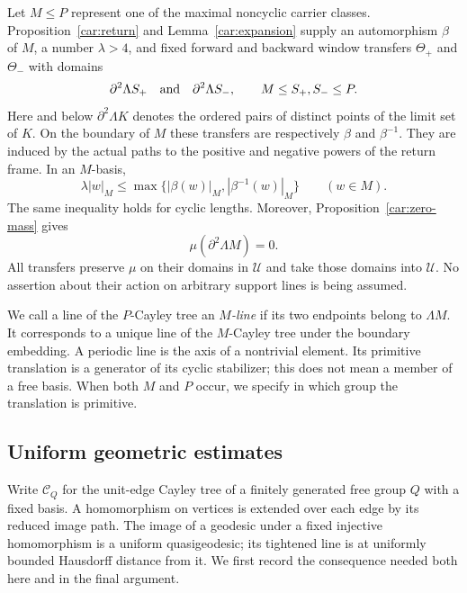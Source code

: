 Let $M\le P$ represent one of the maximal noncyclic carrier classes.
Proposition~\ref{car:return} and Lemma~\ref{car:expansion} supply
an automorphism $\beta$ of $M$, a number $\lambda>4$, and fixed forward
and backward window transfers $\Theta_+$ and $\Theta_-$ with domains
\[
 \partial^2\Lambda S_+\quad\hbox{and}\quad
 \partial^2\Lambda S_-,\qquad M\le S_+,S_-\le P.
\]
Here and below $\partial^2\Lambda K$ denotes the ordered pairs of
distinct points of the limit set of $K$. On the boundary of $M$ these
transfers are respectively $\beta$ and $\beta^{-1}$. They are induced
by the actual paths to the positive and negative powers of the return
frame. In an $M$-basis,
\begin{equation}
 \lambda |w|_M\le
 \max\{|\beta(w)|_M,|\beta^{-1}(w)|_M\}
 \qquad(w\in M).
 \label{exp:based-inequality}
\end{equation}
The same inequality holds for cyclic lengths. Moreover,
Proposition~\ref{car:zero-mass} gives
\begin{equation}
 \mu(\partial^2\Lambda M)=0.
 \label{exp:zero-carrier-mass}
\end{equation}
All transfers preserve $\mu$ on their domains in $\mathcal U$ and
take those domains into $\mathcal U$. No assertion about their action
on arbitrary support lines is being assumed.

We call a line of the $P$-Cayley tree an \emph{$M$-line} if its two
endpoints belong to $\Lambda M$. It corresponds to a unique line of
the $M$-Cayley tree under the boundary embedding. A periodic line is
the axis of a nontrivial element. Its primitive translation is a
generator of its cyclic stabilizer; this does not mean a member of a
free basis. When both $M$ and $P$ occur, we specify in which group the
translation is primitive.

\subsection{Uniform geometric estimates}

Write $\mathcal C_Q$ for the unit-edge Cayley tree of a finitely
generated free group $Q$ with a fixed basis. A homomorphism on vertices
is extended over each edge by its reduced image path. The image of a
geodesic under a fixed injective homomorphism is a uniform
quasigeodesic; its tightened line is at uniformly bounded Hausdorff
distance from it. We first record the consequence needed both here and
in the final argument.


